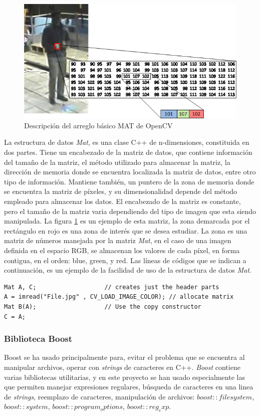 \begin{figure}[h!]
\centering
\includegraphics[scale=0.7]{img/Opencv_mat}
\caption[OpenCV arreglo Mat ]{Descripción del arreglo básico MAT de OpenCV}
\label{fig:mat}
\end{figure}


La estructura de datos \textit{Mat}, es una clase C++ de n-dimensiones, constituida en dos partes. Tiene un encabezado de la matriz de datos, que contiene información del tamaño de la matriz, el método utilizado para almacenar la matriz, la dirección de memoria donde se encuentra localizada la matriz de datos, entre otro tipo de información. Mantiene también, un puntero de la zona de memoria donde se encuentra la matriz de píxeles, y su dimensionalidad depende del método empleado para almacenar los datos. El encabezado de la matriz es constante, pero el tamaño de la matriz varia dependiendo del tipo de imagen que esta siendo manipulada. La figura \ref{fig:mat} es un ejemplo de esta matriz, la zona demarcada por el rectángulo en rojo es una zona de interés que se desea estudiar. La zona es una matriz de números manejada por la matriz \textit{Mat}, en el caso de una imagen definida en el espacio RGB, se almacenan los valores de cada píxel, en forma contigua, en el orden: blue, green, y red. Las líneas de códigos que se indican a continuación, es un ejemplo de la facilidad de uso de la estructura de datos \textit{Mat}.\\


\begin{lstlisting}
Mat A, C;                   // creates just the header parts
A = imread("File.jpg" , CV_LOAD_IMAGE_COLOR); // allocate matrix
Mat B(A);                   // Use the copy constructor
C = A;    
\end{lstlisting}

\subsubsection{Biblioteca Boost}
Boost \cite{boost} se ha usado principalmente para, evitar el problema que se encuentra al manipular archivos, operar con \textit{strings} de caracteres en C++. \textit{Boost} contiene varias bibliotecas utilitarias, y en este proyecto se han usado especialmente las que permiten manejar expresiones regulares, búsqueda de caracteres en una linea de \textit{strings}, reemplazo de caracteres, manipulación de archivos: $boost::filesystem$, $boost::system$, $boost::program_options$, $boost::reg_exp$.


